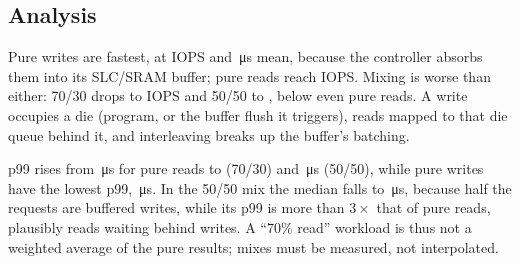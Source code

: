 \begin{table}[!htbp]
  \centering\small
  \caption{Read/write mix at QD=16, \qty{4}{\kibi\byte} random: medians with the IQR in brackets;
  latencies in \si{\micro\second}.}\label{tab:rw-mix}
\end{table}

\subsection{Analysis}
Pure writes are fastest, at  IOPS and
\,\si{\micro\second} mean, because the controller absorbs
them into its SLC/SRAM buffer; pure reads reach  IOPS. Mixing is worse
than either: 70/30 drops to  IOPS and 50/50 to
, below even pure reads. A write occupies a die (program, or the
buffer flush it triggers), reads mapped to that die queue behind it, and interleaving breaks up the
buffer's batching.

p99 rises from \,\si{\micro\second} for pure reads to
 (70/30) and
\,\si{\micro\second} (50/50), while pure writes have the lowest
p99, \,\si{\micro\second}. In the 50/50 mix the median falls to
\,\si{\micro\second}, because half the requests are buffered
writes, while its p99 is more than $3\times$ that of pure reads, plausibly reads waiting behind writes. A
\enquote{70\% read} workload is thus not a weighted average of the pure results; mixes must be measured,
not interpolated.
